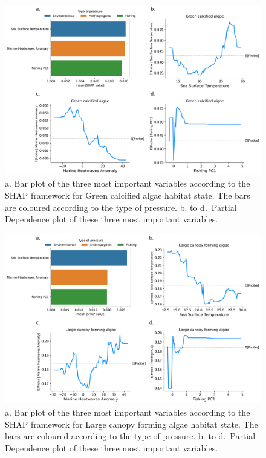 \begin{figure}
\hypertarget{fig:chap3figS43}{%
\centering
\includegraphics{03-Chapitre3/figures/supplementary/04-pdp_Green calcified algae.png}
\caption{a. Bar plot of the three most important variables according to
the SHAP framework for Green calcified algae habitat state. The bars are
coloured according to the type of pressure. b. to d.~Partial Dependence
plot of these three most important variables.}\label{fig:chap3figS43}
}
\end{figure}

\begin{figure}
\hypertarget{fig:chap3figS44}{%
\centering
\includegraphics{03-Chapitre3/figures/supplementary/04-pdp_Large canopy forming algae.png}
\caption{a. Bar plot of the three most important variables according to
the SHAP framework for Large canopy forming algae habitat state. The
bars are coloured according to the type of pressure. b. to d.~Partial
Dependence plot of these three most important
variables.}\label{fig:chap3figS44}
}
\end{figure}

